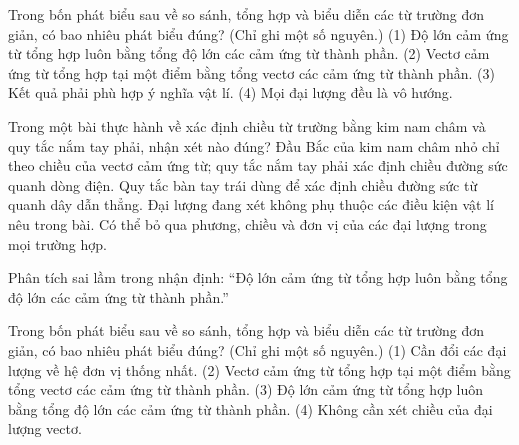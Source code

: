 \begin{ex}
Trong bốn phát biểu sau về so sánh, tổng hợp và biểu diễn các từ trường đơn giản, có bao nhiêu phát biểu đúng? (Chỉ ghi một số nguyên.) (1) Độ lớn cảm ứng từ tổng hợp luôn bằng tổng độ lớn các cảm ứng từ thành phần. (2) Vectơ cảm ứng từ tổng hợp tại một điểm bằng tổng vectơ các cảm ứng từ thành phần. (3) Kết quả phải phù hợp ý nghĩa vật lí. (4) Mọi đại lượng đều là vô hướng.
\end{ex}

\begin{ex}
Trong một bài thực hành về xác định chiều từ trường bằng kim nam châm và quy tắc nắm tay phải, nhận xét nào đúng?
\choice
{\True Đầu Bắc của kim nam châm nhỏ chỉ theo chiều của vectơ cảm ứng từ; quy tắc nắm tay phải xác định chiều đường sức quanh dòng điện.}
{Quy tắc bàn tay trái dùng để xác định chiều đường sức từ quanh dây dẫn thẳng.}
{Đại lượng đang xét không phụ thuộc các điều kiện vật lí nêu trong bài.}
{Có thể bỏ qua phương, chiều và đơn vị của các đại lượng trong mọi trường hợp.}
\end{ex}

\begin{bt}
Phân tích sai lầm trong nhận định: “Độ lớn cảm ứng từ tổng hợp luôn bằng tổng độ lớn các cảm ứng từ thành phần.”
\end{bt}

\begin{ex}
Trong bốn phát biểu sau về so sánh, tổng hợp và biểu diễn các từ trường đơn giản, có bao nhiêu phát biểu đúng? (Chỉ ghi một số nguyên.) (1) Cần đổi các đại lượng về hệ đơn vị thống nhất. (2) Vectơ cảm ứng từ tổng hợp tại một điểm bằng tổng vectơ các cảm ứng từ thành phần. (3) Độ lớn cảm ứng từ tổng hợp luôn bằng tổng độ lớn các cảm ứng từ thành phần. (4) Không cần xét chiều của đại lượng vectơ.
\end{ex}

